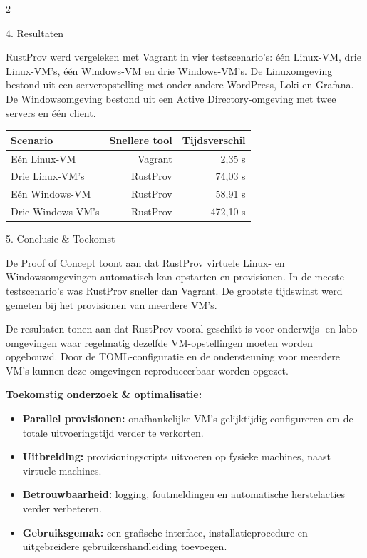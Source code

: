 \documentclass[a0,portrait]{hogent-poster}
\begin{document}
\begin{multicols}{2}

\begin{posterbox}{4. Resultaten}

RustProv werd vergeleken met Vagrant in vier testscenario's: één Linux-VM, drie Linux-VM's, één Windows-VM en drie Windows-VM's. De Linuxomgeving bestond uit een serveropstelling met onder andere WordPress, Loki en Grafana. De Windowsomgeving bestond uit een Active Directory-omgeving met twee servers en één client.

\begin{center}
    \renewcommand{\arraystretch}{1.4}
    \begin{tabular}{lrr}
        \hline
        \textbf{Scenario} & \textbf{Snellere tool} & \textbf{Tijdsverschil} \\
        \hline
        Eén Linux-VM & Vagrant & 2,35 s \\
        Drie Linux-VM's & RustProv & 74,03 s \\
        Eén Windows-VM & RustProv & 58,91 s \\
        Drie Windows-VM's & RustProv & 472,10 s \\
        \hline
    \end{tabular}
\end{center}
\end{posterbox}

\begin{posterbox}{5. Conclusie \& Toekomst}
    
De Proof of Concept toont aan dat RustProv virtuele Linux- en Windowsomgevingen automatisch kan opstarten en provisionen. In de meeste testscenario's was RustProv sneller dan Vagrant. De grootste tijdswinst werd gemeten bij het provisionen van meerdere VM's.

De resultaten tonen aan dat RustProv vooral geschikt is voor onderwijs- en labo-omgevingen waar regelmatig dezelfde VM-opstellingen moeten worden opgebouwd. Door de TOML-configuratie en de ondersteuning voor meerdere VM's kunnen deze omgevingen reproduceerbaar worden opgezet.

\textbf{Toekomstig onderzoek \& optimalisatie:}

\begin{itemize}
    \item \textbf{Parallel provisionen:} onafhankelijke VM's gelijktijdig configureren om de totale uitvoeringstijd verder te verkorten.
    \item \textbf{Uitbreiding:} provisioningscripts uitvoeren op fysieke machines, naast virtuele machines.
    \item \textbf{Betrouwbaarheid:} logging, foutmeldingen en automatische herstelacties verder verbeteren.
    \item \textbf{Gebruiksgemak:} een grafische interface, installatieprocedure en uitgebreidere gebruikershandleiding toevoegen.
\end{itemize}
\end{posterbox}
    

\end{multicols}
\end{document}
